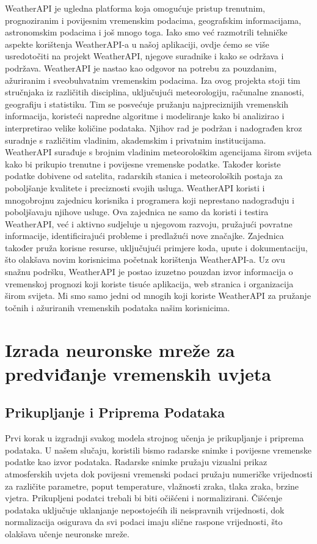 \documentclass[times, utf8, zavrsni]{fer}
\begin{document}
WeatherAPI je ugledna platforma koja omogućuje pristup trenutnim, prognoziranim i povijesnim vremenskim podacima, geografskim informacijama, astronomskim podacima i još mnogo toga. Iako smo već razmotrili tehničke aspekte korištenja WeatherAPI-a u našoj aplikaciji, ovdje ćemo se više usredotočiti na projekt WeatherAPI, njegove suradnike i kako se održava i podržava. WeatherAPI je nastao kao odgovor na potrebu za pouzdanim, ažuriranim i sveobuhvatnim vremenskim podacima. Iza ovog projekta stoji tim stručnjaka iz različitih disciplina, uključujući meteorologiju, računalne znanosti, geografiju i statistiku. Tim se posvećuje pružanju najpreciznijih vremenskih informacija, koristeći napredne algoritme i modeliranje kako bi analizirao i interpretirao velike količine podataka. Njihov rad je podržan i nadograđen kroz suradnje s različitim vladinim, akademskim i privatnim institucijama. WeatherAPI surađuje s brojnim vladinim meteorološkim agencijama širom svijeta kako bi prikupio trenutne i povijesne vremenske podatke. Također koriste podatke dobivene od satelita, radarskih stanica i meteoroloških postaja za poboljšanje kvalitete i preciznosti svojih usluga. WeatherAPI koristi i mnogobrojnu zajednicu korisnika i programera koji neprestano nadograđuju i poboljšavaju njihove usluge. Ova zajednica ne samo da koristi i testira WeatherAPI, već i aktivno sudjeluje u njegovom razvoju, pružajući povratne informacije, identificirajući probleme i predlažući nove značajke. Zajednica također pruža korisne resurse, uključujući primjere koda, upute
i dokumentaciju, što olakšava novim korisnicima početnak korištenja WeatherAPI-a. Uz ovu snažnu podršku, WeatherAPI je postao izuzetno pouzdan izvor informacija o vremenskoj prognozi koji koriste tisuće aplikacija, web stranica i organizacija širom svijeta. Mi smo samo jedni od mnogih koji koriste WeatherAPI za pružanje točnih i ažuriranih vremenskih podataka našim korisnicima.

\chapter{Izrada neuronske mreže za predviđanje vremenskih uvjeta}

\section{Prikupljanje i Priprema Podataka}
Prvi korak u izgradnji svakog modela strojnog učenja je prikupljanje i priprema podataka. U našem slučaju, koristili bismo radarske snimke i povijesne vremenske podatke kao izvor podataka. Radarske snimke pružaju vizualni prikaz atmosferskih uvjeta dok povijesni vremenski podaci pružaju numeričke vrijednosti za različite parametre, poput temperature, vlažnosti zraka, tlaka zraka, brzine vjetra. Prikupljeni podatci trebali bi biti očišćeni i normalizirani. Čišćenje podataka uključuje uklanjanje nepostojećih ili neispravnih vrijednosti, dok normalizacija osigurava da svi podaci imaju slične raspone vrijednosti, što olakšava učenje neuronske mreže.
\end{document}
